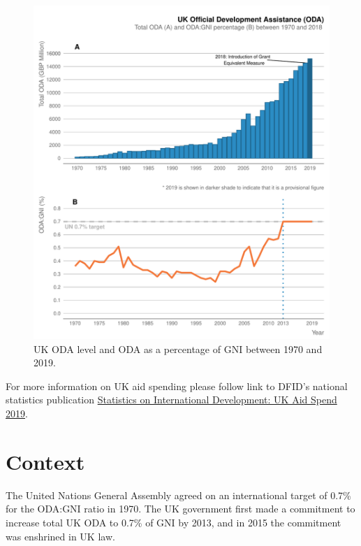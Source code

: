 \begin{figure}[htbp]
  \centering
  \includegraphics[width=1\textwidth]{../figs/oda_gni_plot} \hfill
  \caption{UK ODA level and ODA as a percentage of GNI between 1970 and 2019.}
  \label{fig:oda_gni_plot}
\end{figure}

For more information on UK aid spending please follow link to DFID's national statistics publication \href{https://www.gov.uk/government/statistics/statistics-on-international-development-provisional-uk-aid-spend-2019}{Statistics on International Development: UK Aid Spend 2019}. %

\section{Context}

The United Nations General Assembly agreed on an international target of 0.7\% for the ODA:GNI ratio in 1970. %
The UK government first made a commitment to increase total UK ODA to 0.7\% of GNI by 2013, and in 2015 the commitment was enshrined in UK law. %

\newpage

